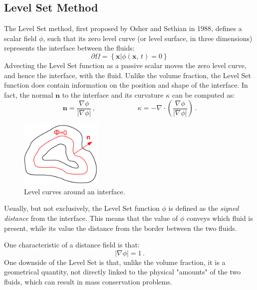 \documentclass[11pt, a4paper, oneside, openany]{book}
\begin{document}
\subsection{Level Set Method}
The Level Set method, first proposed by Osher and Sethian \cite{osher1988fronts} in 1988, defines a scalar field $\phi$, such that its zero level curve (or level surface, in three dimensions) represents the interface between the fluids:
\begin{equation}
\partial\Omega = \left\{\left.\boldsymbol{x}\right|\phi\left(\boldsymbol{x},\,t\right)=0\right\}\label{ZeroLevelCurve}
\end{equation}
Advecting the Level Set function as a passive scalar moves the zero level curve, and hence the interface, with the fluid. Unlike the volume fraction, the Level Set function does contain information on the position and shape of the interface. In fact, the normal $\boldsymbol{n}$ to the interface and its curvature $\kappa$ can be computed as:
\begin{equation}
\boldsymbol{n}=\dfrac{\nabla\phi}{\left|\nabla\phi\right|}\,,\qquad\qquad\qquad \kappa=-\nabla\cdot\left(\dfrac{\nabla\phi}{\left|\nabla\phi\right|}\right)\,.\label{LevelSetNormalCurvature}
\end{equation}
\begin{figure}[!ht]
	\centering
	\includegraphics[width=0.35\textwidth]{LevelSet.pdf}
	\caption[level Set curve]{Level curves around an interface.}
	\label{LevelSet}
\end{figure}\noindent
Usually, but not exclusively, the Level Set function $\phi$ is defined as the \textit{signed distance} from the interface. This means that the value of $\phi$ conveys which fluid is present, while its value the distance from the border between the two fluids.\par
One characteristic of a distance field is that:
\begin{equation}
\left|\nabla\phi\right|=1\,.\label{LevelSetGradient}
\end{equation}
One downside of the Level Set is that, unlike the volume fraction, it is a geometrical quantity, not directly linked to the physical "amounts" of the two fluids, which can result in mass conservation problems.\par
\end{document}
